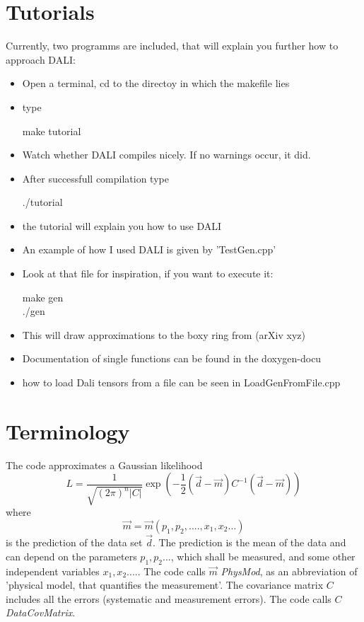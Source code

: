 \documentclass[12pt,twoside]{extarticle}
\newenvironment{exercise}{\begin{eBox}}{\hfill{\color{daliblue}}\end{eBox}}
\begin{document}
\section{Tutorials}
Currently, two programms are included, that will explain you further how to approach DALI:
\begin{itemize}
 \item Open a terminal, cd to the directoy in which the makefile lies
\item type
\begin{exercise}
 make tutorial
\end{exercise}

\item Watch whether DALI compiles nicely. If no warnings occur, it did.
\item After successfull compilation type 
\begin{exercise}
 ./tutorial
\end{exercise}
\item the tutorial will explain you how to use DALI
\item An example of how I used DALI is given by 'TestGen.cpp'
\item Look at that file for inspiration, if you want to execute it:
\begin{exercise}
 make gen\\
 ./gen
\end{exercise}
\item This will draw approximations to the boxy ring from (arXiv xyz)
\item Documentation of single functions can be found in the doxygen-docu
\item how to load Dali tensors from a file can be seen in LoadGenFromFile.cpp
\end{itemize}



\section{Terminology}
The code approximates a Gaussian likelihood
\begin{equation}
 L = \frac{1}{\sqrt{(2\pi)^n |C|}} \exp\left(-\frac{1}{2} (\vec{d} -\vec{m}) C^{-1}  (\vec{d} -\vec{m}) \right)
\end{equation}
where
\begin{equation}
\vec{m}= \vec{m}(p_1, p_2,...., x_1,x_2...)
\end{equation}
is the prediction of the data set $\vec{d}$. The prediction is the mean of the data and can depend on the parameters $p_1,p_2...$, which shall be measured, and some other independent variables $x_1,x_2....$. The code calls $\vec{m}$ \emph{PhysMod}, as an abbreviation of 'physical model, that quantifies the measurement'. The covariance matrix $C$ includes all the errors (systematic and measurement errors). The code calls $C$ \emph{DataCovMatrix}.
\end{document}
